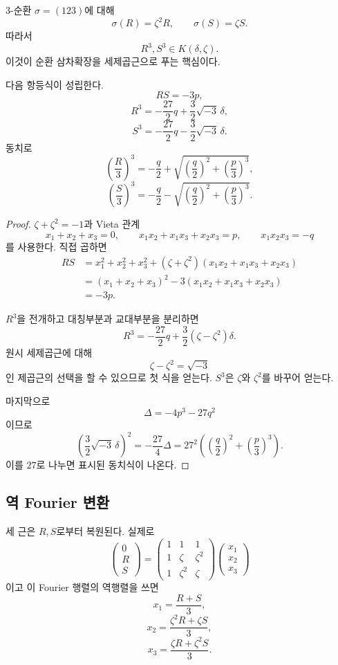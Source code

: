 $3$-순환 $\sigma=(123)$에 대해
\[
  \sigma(R)=\zeta^2R,
  \qquad
  \sigma(S)=\zeta S.
\]
따라서
\[
  R^3,S^3\in K(\delta,\zeta).
\]
이것이 순환 삼차확장을 세제곱근으로 푸는 핵심이다.

\begin{proposition}
\label{prop:cubic-resolvent-identities}
다음 항등식이 성립한다.
\[
  RS=-3p,
\]
\[
  R^3=-\frac{27}{2}q+\frac32\sqrt{-3}\,\delta,
\]
\[
  S^3=-\frac{27}{2}q-\frac32\sqrt{-3}\,\delta.
\]
동치로
\[
  \left(\frac R3\right)^3
  =-\frac q2+\sqrt{\left(\frac q2\right)^2
  +\left(\frac p3\right)^3},
\]
\[
  \left(\frac S3\right)^3
  =-\frac q2-\sqrt{\left(\frac q2\right)^2
  +\left(\frac p3\right)^3}.
\]
\end{proposition}

\begin{proof}
$\zeta+\zeta^2=-1$과 Vieta 관계
\[
  x_1+x_2+x_3=0,
  \qquad
  x_1x_2+x_1x_3+x_2x_3=p,
  \qquad
  x_1x_2x_3=-q
\]
를 사용한다. 직접 곱하면
\[
\begin{aligned}
RS
&=x_1^2+x_2^2+x_3^2
 +(\zeta+\zeta^2)(x_1x_2+x_1x_3+x_2x_3)\\
&=(x_1+x_2+x_3)^2
 -3(x_1x_2+x_1x_3+x_2x_3)\\
&=-3p.
\end{aligned}
\]

$R^3$을 전개하고 대칭부분과 교대부분을 분리하면
\[
  R^3=-\frac{27}{2}q+\frac32(\zeta-\zeta^2)\delta.
\]
원시 세제곱근에 대해
\[
  \zeta-\zeta^2=\sqrt{-3}
\]
인 제곱근의 선택을 할 수 있으므로 첫 식을 얻는다. $S^3$은 $\zeta$와 $\zeta^2$를 바꾸어 얻는다.

마지막으로
\[
  \Delta=-4p^3-27q^2
\]
이므로
\[
  \left(\frac32\sqrt{-3}\,\delta\right)^2
  =-\frac{27}{4}\Delta
  =27^2\left(
  \left(\frac q2\right)^2+\left(\frac p3\right)^3
  \right).
\]
이를 $27$로 나누면 표시된 동치식이 나온다.
\end{proof}

\subsection{역 Fourier 변환}

세 근은 $R,S$로부터 복원된다. 실제로
\[
\begin{pmatrix}
0\\R\\S
\end{pmatrix}
=
\begin{pmatrix}
1&1&1\\
1&\zeta&\zeta^2\\
1&\zeta^2&\zeta
\end{pmatrix}
\begin{pmatrix}
x_1\\x_2\\x_3
\end{pmatrix}
\]
이고 이 Fourier 행렬의 역행렬을 쓰면
\[
  x_1=\frac{R+S}{3},
\]
\[
  x_2=\frac{\zeta^2R+\zeta S}{3},
\]
\[
  x_3=\frac{\zeta R+\zeta^2S}{3}.
\]

